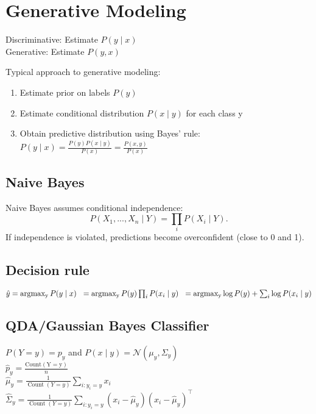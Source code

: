 \section*{Generative Modeling}
Discriminative: Estimate $P(y\mid x)$\\
Generative: Estimate $P(y,x)$

Typical approach to generative modeling:
\begin{enumerate}[noitemsep,leftmargin=6mm,topsep=2pt,parsep=2pt,partopsep=2pt]
    \item Estimate prior on labels $P(y)$
    \item Estimate conditional distribution $P(x\mid y)$ for each class y
    \item Obtain predictive distribution using Bayes' rule:
$P(y\mid x) = \frac{P(y) P(x\mid y)}{P(x)} = \frac{P(x,y)}{P(x)}$
\end{enumerate}

\subsection*{Naive Bayes}
Naive Bayes assumes conditional independence:
$$P(X_1,...,X_n\mid Y) = \prod_i P(X_i\mid Y).$$
If independence is violated, predictions become overconfident (close to 0 and 1).

\subsection*{Decision rule}
$\hat{y} = \operatorname{argmax_{y}} P(y\mid x)\\
\hspace*{2.1mm}= \operatorname{argmax_{y}} P(y) \prod_{i} P(x_i\mid y)\\
\hspace*{2.1mm}= \operatorname{argmax_{y}} \log P(y) + \sum_{i} \log P(x_i\mid y)$

\subsection*{QDA/Gaussian Bayes Classifier}
$P(Y=y) = p_y$ and $P(x\mid y) = \mathcal{N}({\mu}_y, {\Sigma}_y)$\\
$\hat{p}_y= \frac{\operatorname{Count(Y = y)}}{n}$\\
$\hat{\mu}_{y} = \frac{1}{\operatorname{Count}(Y=y)} \sum_{i:y_i=y} {x_i} $\\
$\hat{\Sigma}_{y} = \frac{1}{\operatorname{Count}(Y=y)} \sum_{i:y_i=y} (x_i - \hat{\mu}_{y})(x_i-\hat{\mu}_y)^\top $

